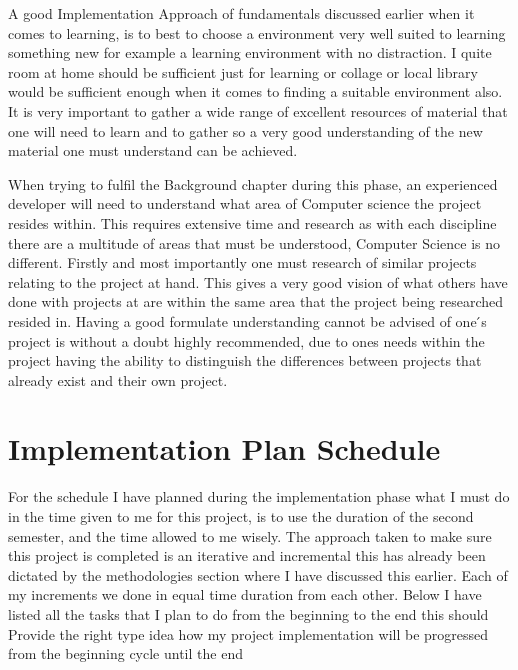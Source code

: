 A good Implementation Approach of fundamentals discussed earlier when it comes to learning, is to best to choose a  environment very well suited to learning something new for example a learning environment with  no distraction. I quite room at home should be sufficient  just for learning or collage or local library would be sufficient enough when it comes to finding a suitable environment also.  It is  very important to gather a wide range of excellent resources of material that one will need to learn and to gather  so a very good understanding of the new material one must understand can be achieved. 

When trying to fulfil the Background chapter during this phase, an experienced developer will need to understand what area of Computer science the project resides within.  This requires extensive time and research as with each discipline there are a multitude of areas that must be understood, Computer Science is no different.  Firstly and  most importantly  one must  research of similar projects relating to the project at hand.  This gives a very good vision of what others have done  with projects at are within the same area that the project being researched resided in.  Having a good formulate understanding cannot be advised of one ́s project is without a doubt highly recommended, due to ones needs within the project having the ability to distinguish the differences between projects that already exist and their own project.
\section{Implementation Plan Schedule}
For the schedule I have planned during the implementation phase what I must do in the  time given to me for this project,  is to use the  duration  of  the second semester, and the time allowed to me wisely. The approach taken to make sure this project is completed is an iterative and incremental this has already been dictated by the methodologies section where I have discussed this earlier. Each of my increments we done  in equal time duration from each other.  Below I have listed all the tasks that I plan to do from the beginning to the end this should Provide the right type idea how my project implementation will be progressed from the beginning cycle until the end

